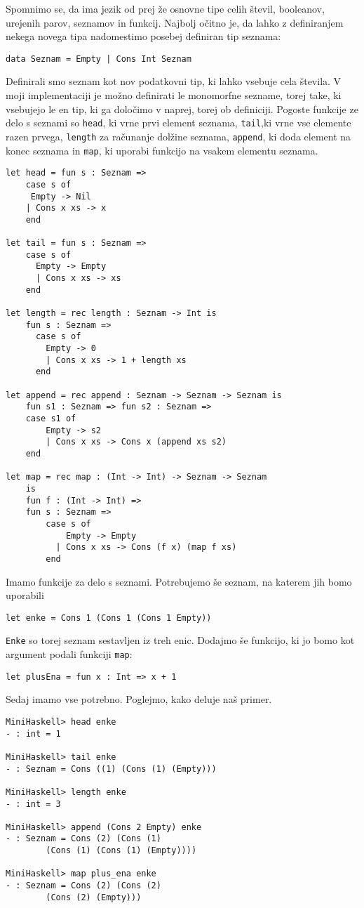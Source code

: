 \documentclass[12pt,a4paper,openany]{book}
\begin{document}
Spomnimo se, da ima jezik od prej že osnovne tipe celih števil, booleanov, urejenih parov, seznamov in funkcij. Najbolj očitno je, da lahko z definiranjem nekega novega tipa nadomestimo posebej 
definiran tip seznama:
\begin{lstlisting}
data Seznam = Empty | Cons Int Seznam
\end{lstlisting}
Definirali smo seznam kot nov podatkovni tip, ki lahko vsebuje cela števila. V moji implementaciji je možno definirati le monomorfne sezname, torej take, ki vsebujejo le en tip, ki ga določimo v naprej, torej ob definiciji. 
Pogoste funkcije ze delo s seznami so \lstinline{head}, ki vrne prvi element seznama, \lstinline{tail},ki vrne vse elemente razen prvega, \lstinline{length} za računanje 
dolžine seznama, \lstinline{append}, ki doda element na konec seznama in \lstinline{map}, ki uporabi funkcijo na vsakem elementu seznama. 
\begin{lstlisting}
let head = fun s : Seznam => 
    case s of
     Empty -> Nil
    | Cons x xs -> x
    end

let tail = fun s : Seznam =>
	case s of
	  Empty -> Empty
	  | Cons x xs -> xs
	end

let length = rec length : Seznam -> Int is
	fun s : Seznam =>
	  case s of
		Empty -> 0
		| Cons x xs -> 1 + length xs
	  end

let append = rec append : Seznam -> Seznam -> Seznam is
	fun s1 : Seznam => fun s2 : Seznam => 
	case s1 of
		Empty -> s2
		| Cons x xs -> Cons x (append xs s2)
	end

let map = rec map : (Int -> Int) -> Seznam -> Seznam 
    is
	fun f : (Int -> Int) =>
    fun s : Seznam =>
	    case s of
	        Empty -> Empty
	      | Cons x xs -> Cons (f x) (map f xs)
	    end
\end{lstlisting}
Imamo funkcije za delo s seznami. Potrebujemo še seznam, na katerem jih bomo uporabili
\begin{lstlisting}
let enke = Cons 1 (Cons 1 (Cons 1 Empty))
\end{lstlisting}
\lstinline{Enke} so torej seznam sestavljen iz treh enic. Dodajmo še funkcijo, ki jo bomo kot argument podali funkciji \lstinline{map}:
\begin{lstlisting}
let plusEna = fun x : Int => x + 1
\end{lstlisting}
Sedaj imamo vse potrebno. Poglejmo, kako deluje naš primer.
\begin{lstlisting}
MiniHaskell> head enke
- : int = 1

MiniHaskell> tail enke
- : Seznam = Cons ((1) (Cons (1) (Empty)))

MiniHaskell> length enke
- : int = 3

MiniHaskell> append (Cons 2 Empty) enke
- : Seznam = Cons (2) (Cons (1) 
        (Cons (1) (Cons (1) (Empty))))

MiniHaskell> map plus_ena enke
- : Seznam = Cons (2) (Cons (2) 
        (Cons (2) (Empty)))
\end{lstlisting}
\end{document}
